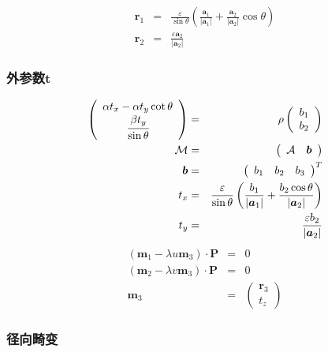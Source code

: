 \documentclass{beamer}
\newcommand{\cdummy}{\cdot}
\newcommand{\tmmathbf}[1]{\ensuremath{\boldsymbol{#1}}}
\begin{document}
{{\begin{frame}
  
  \begin{eqnarray*}
    \tmmathbf{r}_1 & = & \frac{\varepsilon}{\sin \theta} \left(
    \frac{\tmmathbf{a}_1}{| \tmmathbf{a}_1 |} + \frac{\tmmathbf{a}_2}{|
    \tmmathbf{a}_2 |} \cos \theta \right)\\
    \tmmathbf{r}_2 & = & \frac{\varepsilon \tmmathbf{a}_2}{| \tmmathbf{a}_2 |}
  \end{eqnarray*}
  
\end{frame}}{\begin{frame}
  \frametitle{外参数$\tmmathbf{t}$}
  \begin{eqnarray*}
    \left(\begin{array}{c}
      \alpha t_x - \alpha t_y \cot \theta\\
      \cfrac{\beta t_y}{\sin \theta}
    \end{array}\right) & = & \rho \left(\begin{array}{c}
      b_1\\
      b_2
    \end{array}\right)\\
    \mathcal{M} & = & \left(\begin{array}{cc}
      \mathcal{A} & \tmmathbf{b}
    \end{array}\right)\\
    \tmmathbf{b} & = & \left(\begin{array}{ccc}
      b_1 & b_2 & b_3
    \end{array}\right)^T\\
    t_x & = & \frac{\varepsilon}{\sin \theta} \left( \frac{b_1}{|
    \tmmathbf{a}_1 |} + \frac{b_2 \cos \theta}{| \tmmathbf{a}_2 |} \right)\\
    t_y & = & \frac{\varepsilon b_2}{| \tmmathbf{a}_2 |}
  \end{eqnarray*}
  \begin{eqnarray*}
    (\tmmathbf{m}_1 - \lambda u\tmmathbf{m}_3) \cdummy \tmmathbf{P} & = & 0\\
    (\tmmathbf{m}_2 - \lambda v\tmmathbf{m}_3) \cdummy \tmmathbf{P} & = & 0\\
    \tmmathbf{m}_3 & = & \left(\begin{array}{c}
      \tmmathbf{r}_3\\
      t_z
    \end{array}\right)
  \end{eqnarray*}
\end{frame}}{\begin{frame}
  \frametitle{径向畸变}

\end{frame}}}
\end{document}
